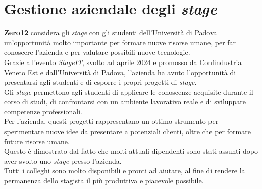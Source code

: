 \section{Gestione aziendale degli \textit{stage}}  
\label{sez:gestione-aziendale-stage}  

\textbf{Zero12} considera gli \textit{stage} con gli studenti dell'Università di Padova un'opportunità molto importante per formare nuove risorse umane,
per far conoscere l'azienda e per valutare possibili nuove tecnologie.\\  
Grazie all'evento \textit{StageIT}, svolto ad aprile 2024 e promosso da Confindustria Veneto Est e dall'Università di Padova, 
l'azienda ha avuto l'opportunità di presentarsi agli studenti e di esporre i propri progetti di \textit{stage}.\\  

\noindent Gli \textit{stage} permettono agli studenti di applicare le conoscenze acquisite durante il corso di studi, 
di confrontarsi con un ambiente lavorativo reale e di sviluppare competenze professionali.\\  
Per l'azienda, questi progetti rappresentano un ottimo strumento per sperimentare nuove idee da presentare a potenziali clienti, 
oltre che per formare future risorse umane.\\  
Questo è dimostrato dal fatto che molti attuali dipendenti sono stati assunti dopo aver svolto uno \textit{stage} presso l'azienda.\\  
Tutti i colleghi sono molto disponibili e pronti ad aiutare, al fine di rendere la permanenza dello stagista il più produttiva e piacevole possibile.\\  
